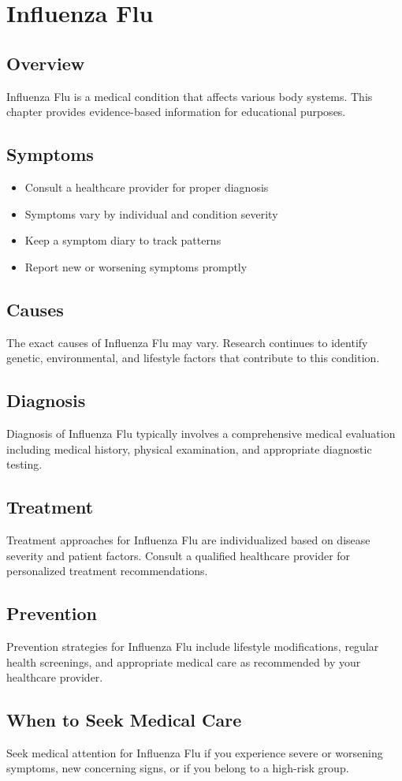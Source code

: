 \chapter{Influenza Flu}

\section*{Overview}
Influenza Flu is a medical condition that affects various body systems. This chapter provides evidence-based information for educational purposes.

\section*{Symptoms}
\begin{itemize}
  \item Consult a healthcare provider for proper diagnosis
  \item Symptoms vary by individual and condition severity
  \item Keep a symptom diary to track patterns
  \item Report new or worsening symptoms promptly
\end{itemize}

\section*{Causes}
The exact causes of Influenza Flu may vary. Research continues to identify genetic, environmental, and lifestyle factors that contribute to this condition.

\section*{Diagnosis}
Diagnosis of Influenza Flu typically involves a comprehensive medical evaluation including medical history, physical examination, and appropriate diagnostic testing.

\section*{Treatment}
Treatment approaches for Influenza Flu are individualized based on disease severity and patient factors. Consult a qualified healthcare provider for personalized treatment recommendations.

\section*{Prevention}
Prevention strategies for Influenza Flu include lifestyle modifications, regular health screenings, and appropriate medical care as recommended by your healthcare provider.

\section*{When to Seek Medical Care}
Seek medical attention for Influenza Flu if you experience severe or worsening symptoms, new concerning signs, or if you belong to a high-risk group.
\clearpage
